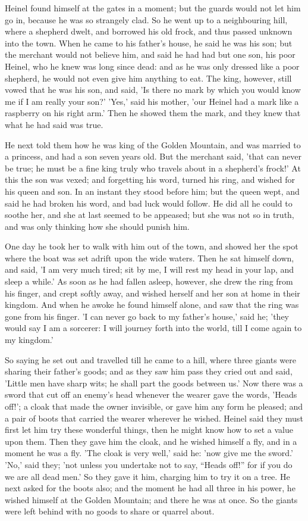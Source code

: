 \documentclass[12pt]{book}
\begin{document}
Heinel found himself at the gates in a moment; but the guards would
not let him go in, because he was so strangely clad. So he went up to
a neighbouring hill, where a shepherd dwelt, and borrowed his old
frock, and thus passed unknown into the town. When he came to his
father's house, he said he was his son; but the merchant would not
believe him, and said he had had but one son, his poor Heinel, who he
knew was long since dead: and as he was only dressed like a poor
shepherd, he would not even give him anything to eat. The king,
however, still vowed that he was his son, and said, 'Is there no mark
by which you would know me if I am really your son?' 'Yes,' said his
mother, 'our Heinel had a mark like a raspberry on his right arm.'
Then he showed them the mark, and they knew that what he had said was
true.

He next told them how he was king of the Golden Mountain, and was
married to a princess, and had a son seven years old. But the merchant
said, 'that can never be true; he must be a fine king truly who travels
about in a shepherd's frock!' At this the son was vexed; and forgetting
his word, turned his ring, and wished for his queen and son. In an
instant they stood before him; but the queen wept, and said he had
broken his word, and bad luck would follow. He did all he could to
soothe her, and she at last seemed to be appeased; but she was not so in
truth, and was only thinking how she should punish him.

One day he took her to walk with him out of the town, and showed her
the spot where the boat was set adrift upon the wide waters. Then he
sat himself down, and said, 'I am very much tired; sit by me, I will
rest my head in your lap, and sleep a while.' As soon as he had fallen
asleep, however, she drew the ring from his finger, and crept softly
away, and wished herself and her son at home in their kingdom. And
when he awoke he found himself alone, and saw that the ring was gone
from his finger. 'I can never go back to my father's house,' said he;
'they would say I am a sorcerer: I will journey forth into the world,
till I come again to my kingdom.'

So saying he set out and travelled till he came to a hill, where three
giants were sharing their father's goods; and as they saw him pass
they cried out and said, 'Little men have sharp wits; he shall part
the goods between us.' Now there was a sword that cut off an enemy's
head whenever the wearer gave the words, 'Heads off!'; a cloak that
made the owner invisible, or gave him any form he pleased; and a pair
of boots that carried the wearer wherever he wished. Heinel said they
must first let him try these wonderful things, then he might know how
to set a value upon them. Then they gave him the cloak, and he wished
himself a fly, and in a moment he was a fly. 'The cloak is very well,'
said he: 'now give me the sword.' 'No,' said they; 'not unless you
undertake not to say, ``Heads off!'' for if you do we are all dead men.'
So they gave it him, charging him to try it on a tree. He next asked
for the boots also; and the moment he had all three in his power, he
wished himself at the Golden Mountain; and there he was at once. So
the giants were left behind with no goods to share or quarrel about.
\end{document}
